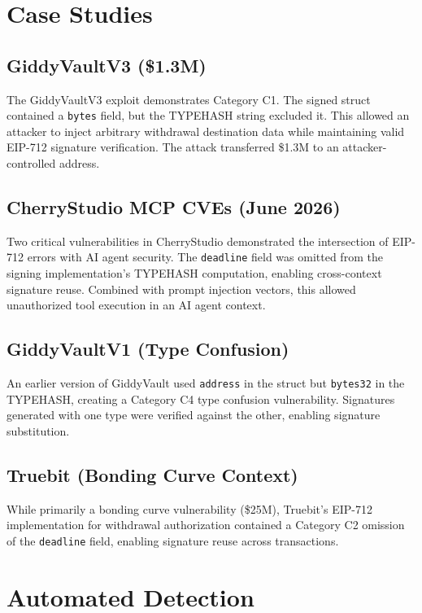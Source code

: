 \documentclass[runningheads]{llncs}
\begin{document}
\section{Case Studies}

\subsection{GiddyVaultV3 (\$1.3M)}

The GiddyVaultV3 exploit demonstrates Category C1. The signed struct contained a \texttt{bytes} field, but the TYPEHASH string excluded it. This allowed an attacker to inject arbitrary withdrawal destination data while maintaining valid EIP-712 signature verification. The attack transferred \$1.3M to an attacker-controlled address.

\subsection{CherryStudio MCP CVEs (June 2026)}

Two critical vulnerabilities in CherryStudio demonstrated the intersection of EIP-712 errors with AI agent security. The \texttt{deadline} field was omitted from the signing implementation's TYPEHASH computation, enabling cross-context signature reuse. Combined with prompt injection vectors, this allowed unauthorized tool execution in an AI agent context.

\subsection{GiddyVaultV1 (Type Confusion)}

An earlier version of GiddyVault used \texttt{address} in the struct but \texttt{bytes32} in the TYPEHASH, creating a Category C4 type confusion vulnerability. Signatures generated with one type were verified against the other, enabling signature substitution.

\subsection{Truebit (Bonding Curve Context)}

While primarily a bonding curve vulnerability (\$25M), Truebit's EIP-712 implementation for withdrawal authorization contained a Category C2 omission of the \texttt{deadline} field, enabling signature reuse across transactions.

\section{Automated Detection}
\end{document}
